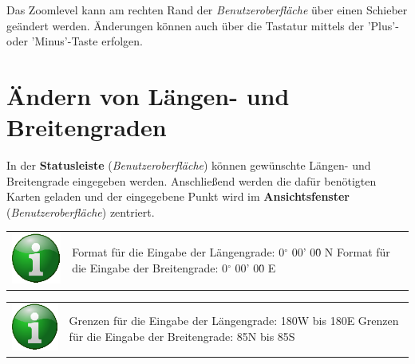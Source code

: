 \documentclass[10pt]{scrreprt}
\newcommand{\textref}[1]{\mbox{\raisebox{0.1ex}{\small$\rightarrow$ }\textit{#1}}}
\begin{document}
\vspace{3mm}
Das Zoomlevel kann am rechten Rand der \textref{Benutzeroberfläche} über einen Schieber geändert werden. Änderungen können auch über die Tastatur mittels der 'Plus'- oder 'Minus'-Taste erfolgen.







\vspace{3mm}
\section{Ändern von Längen- und Breitengraden}
 

In der \textbf{Statusleiste} (\textref{Benutzeroberfläche}) können gewünschte Längen- und Breitengrade eingegeben werden. Anschließend werden die dafür benötigten Karten geladen und der eingegebene Punkt wird im \textbf{Ansichtsfenster} (\textref{Benutzeroberfläche}) zentriert.

\vspace{3mm}
\begin{tabular}{>{\centering \arraybackslash}m{1cm} m{14cm}}
\includegraphics[scale=0.5]{images/info.eps} & \flushleft Format für die Eingabe der Längengrade: 0$^\circ$ 00' 00\"{} N \linebreak Format für die Eingabe der Breitengrade: 0$^\circ$ 00' 00\"{} E
\end{tabular}

\vspace{3mm}
\begin{tabular}{>{\centering \arraybackslash}m{1cm} m{14cm}}
\includegraphics[scale=0.5]{images/info.eps} & \flushleft Grenzen für die Eingabe der Längengrade: 180W bis 180E \linebreak Grenzen für die Eingabe der Breitengrade: 85N bis 85S
\end{tabular}
\end{document}
